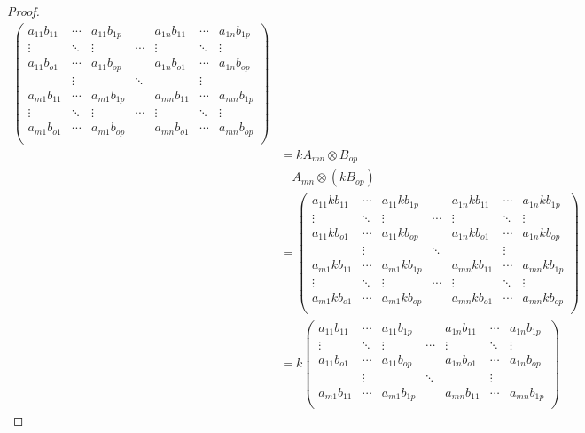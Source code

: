 \documentclass[dvipdfmx]{jsarticle}
\begin{document}
\begin{proof}
\begin{align*}
\begin{pmatrix}
a_{11}b_{11} & \cdots & a_{11}b_{1p} & \  & a_{1n}b_{11} & \cdots & a_{1n}b_{1p} \\
 \vdots & \ddots & \vdots & \cdots & \vdots & \ddots & \vdots \\
a_{11}b_{o1} & \cdots & a_{11}b_{op} & \  & a_{1n}b_{o1} & \cdots & a_{1n}b_{op} \\
\  & \vdots & \  & \ddots & \  & \vdots & \  \\
a_{m1}b_{11} & \cdots & a_{m1}b_{1p} & \  & a_{mn}b_{11} & \cdots & a_{mn}b_{1p} \\
 \vdots & \ddots & \vdots & \cdots & \vdots & \ddots & \vdots \\
a_{m1}b_{o1} & \cdots & a_{m1}b_{op} & \  & a_{mn}b_{o1} & \cdots & a_{mn}b_{op} \\
\end{pmatrix}\\
&= kA_{mn} \otimes B_{op}\\
&\quad A_{mn} \otimes \left( kB_{op} \right)\\
&= \begin{pmatrix}
a_{11}kb_{11} & \cdots & a_{11}kb_{1p} & \  & a_{1n}kb_{11} & \cdots & a_{1n}kb_{1p} \\
 \vdots & \ddots & \vdots & \cdots & \vdots & \ddots & \vdots \\
a_{11}kb_{o1} & \cdots & a_{11}kb_{op} & \  & a_{1n}kb_{o1} & \cdots & a_{1n}kb_{op} \\
\  & \vdots & \  & \ddots & \  & \vdots & \  \\
a_{m1}kb_{11} & \cdots & a_{m1}kb_{1p} & \  & a_{mn}kb_{11} & \cdots & a_{mn}kb_{1p} \\
 \vdots & \ddots & \vdots & \cdots & \vdots & \ddots & \vdots \\
a_{m1}kb_{o1} & \cdots & a_{m1}kb_{op} & \  & a_{mn}kb_{o1} & \cdots & a_{mn}kb_{op} \\
\end{pmatrix}\\
&= k\begin{pmatrix}
a_{11}b_{11} & \cdots & a_{11}b_{1p} & \  & a_{1n}b_{11} & \cdots & a_{1n}b_{1p} \\
 \vdots & \ddots & \vdots & \cdots & \vdots & \ddots & \vdots \\
a_{11}b_{o1} & \cdots & a_{11}b_{op} & \  & a_{1n}b_{o1} & \cdots & a_{1n}b_{op} \\
\  & \vdots & \  & \ddots & \  & \vdots & \  \\
a_{m1}b_{11} & \cdots & a_{m1}b_{1p} & \  & a_{mn}b_{11} & \cdots & a_{mn}b_{1p} \\

\end{pmatrix}
\end{align*}
\end{proof}
\end{document}

